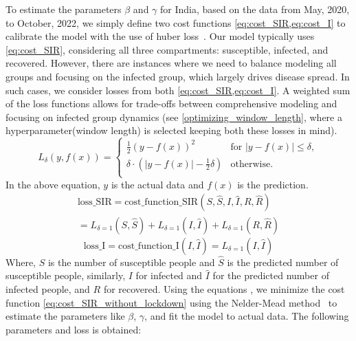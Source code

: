 \documentclass[tikz,fleqn,12pt]{wlscirep}
\begin{document}
To estimate the parameters $\beta$ and $\gamma$ for India, based on the data from May, 2020, to October, 2022, we simply define two cost functions \cref{eq:cost_SIR,eq:cost_I} to calibrate the model with the use of huber loss~\cite{huberloss}. Our model typically uses \cref{eq:cost_SIR}, considering all three compartments: susceptible, infected, and recovered. However, there are instances where we need to balance modeling all groups and focusing on the infected group, which largely drives disease spread. In such cases, we consider losses from both \cref{eq:cost_SIR,eq:cost_I}. A weighted sum of the loss functions allows for trade-offs between comprehensive modeling and focusing on infected group dynamics (see \cref{optimizing_window_length}, where a hyperparameter(window length) is selected keeping both these losses in mind).
\begin{equation}
  L_{\delta}(y, f(x)) = 
  \begin{cases}
    \frac{1}{2}{(y - f(x))^2} & \text{for } |y - f(x)| \leq \delta, \\
    \delta \cdot (|y - f(x)| - \frac{1}{2}\delta) & \text{otherwise.} \\
  \end{cases}
  \label{eq:huberloss}
\end{equation}
In the above equation, $y$ is the actual data and $f(x)$ is the prediction.
\begin{equation}
  \begin{split}
  \textrm{loss\_SIR} = \textrm{cost\_function\_SIR}(S, \hat{S}, I, \hat{I}, R, \hat{R}) \\
  = L_{\delta = 1}(S, \hat{S}) + L_{\delta = 1}(I, \hat{I}) + L_{\delta = 1}(R, \hat{R})
  \end{split}
  \label{eq:cost_SIR}
\end{equation}
\begin{equation}
  \textrm{loss\_I} = \textrm{cost\_function\_I}(I, \hat{I}) = L_{\delta = 1}(I, \hat{I})
  \label{eq:cost_I}
\end{equation}
Where, $S$ is the number of susceptible people and $\hat{S}$ is the predicted number of susceptible people, similarly, $I$ for infected and $\hat{I}$ for the predicted number of infected people, and $R$ for recovered. Using the equations , we minimize the cost function \cref{eq:cost_SIR_without_lockdown} using the Nelder-Mead method~\cite{Gao2010} to estimate the parameters like $\beta$, $\gamma$, and fit the model to actual data. The following parameters and loss is obtained:
\end{document}
